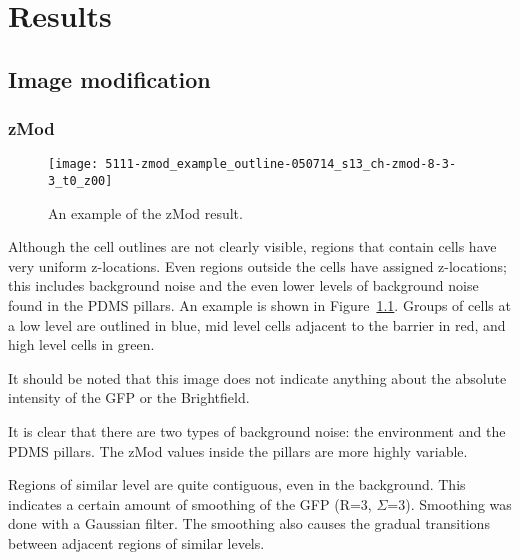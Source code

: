 
\chapter{Results}

\ifpdf
    \graphicspath{{Chapter6/Figs/Raster/}{Chapter6/Figs/PDF/}{Chapter6/Figs/}}
\else
    \graphicspath{{Chapter6/Figs/Vector/}{Chapter6/Figs/}}
\fi

\section{Image modification}

\subsection{zMod}

\begin{figure}[htbp!]
\centering
\texttt{[image: 5111-zmod\_example\_outline-050714\_s13\_ch-zmod-8-3-3\_t0\_z00]}
\caption[zMod example]{An example of the zMod result.}
\label{fig:zmod_result}
\end{figure}

Although the cell outlines are not clearly visible, regions that contain cells have very uniform z-locations. Even regions outside the cells have assigned z-locations; this includes background noise and the even lower levels of background noise found in the PDMS pillars. An example is shown in Figure~\ref{fig:zmod_result}. Groups of cells at a low level are outlined in blue, mid level cells adjacent to the barrier in red, and high level cells in green.

It should be noted that this image does not indicate anything about the absolute intensity of the GFP or the Brightfield.

It is clear that there are two types of background noise: the environment and the PDMS pillars. The zMod values inside the pillars are more highly variable.

Regions of similar level are quite contiguous, even in the background. This indicates a certain amount of smoothing of the GFP (R=3, $\Sigma$=3). Smoothing was done with a Gaussian filter. The smoothing also causes the gradual transitions between adjacent regions of similar levels.

